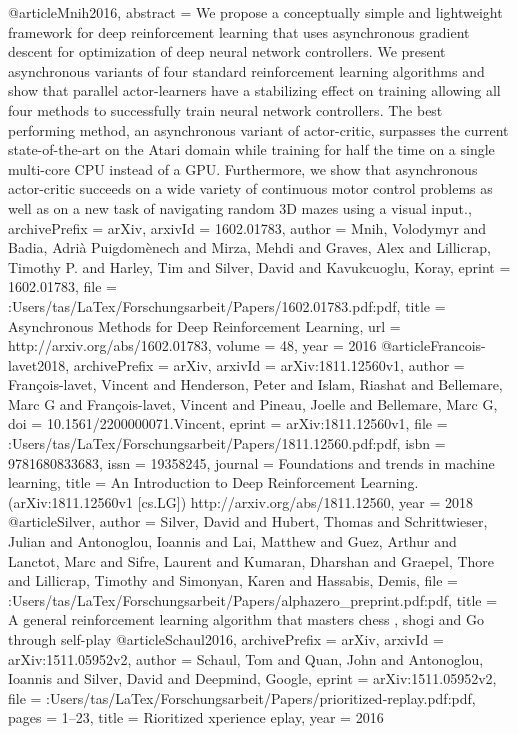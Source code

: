 @article{Mnih2016,
abstract = {We propose a conceptually simple and lightweight framework for deep reinforcement learning that uses asynchronous gradient descent for optimization of deep neural network controllers. We present asynchronous variants of four standard reinforcement learning algorithms and show that parallel actor-learners have a stabilizing effect on training allowing all four methods to successfully train neural network controllers. The best performing method, an asynchronous variant of actor-critic, surpasses the current state-of-the-art on the Atari domain while training for half the time on a single multi-core CPU instead of a GPU. Furthermore, we show that asynchronous actor-critic succeeds on a wide variety of continuous motor control problems as well as on a new task of navigating random 3D mazes using a visual input.},
archivePrefix = {arXiv},
arxivId = {1602.01783},
author = {Mnih, Volodymyr and Badia, Adri{\`{a}} Puigdom{\`{e}}nech and Mirza, Mehdi and Graves, Alex and Lillicrap, Timothy P. and Harley, Tim and Silver, David and Kavukcuoglu, Koray},
eprint = {1602.01783},
file = {:Users/tas/LaTex/Forschungsarbeit/Papers/1602.01783.pdf:pdf},
title = {{Asynchronous Methods for Deep Reinforcement Learning}},
url = {http://arxiv.org/abs/1602.01783},
volume = {48},
year = {2016}
}
@article{Francois-lavet2018,
archivePrefix = {arXiv},
arxivId = {arXiv:1811.12560v1},
author = {Fran{\c{c}}ois-lavet, Vincent and Henderson, Peter and Islam, Riashat and Bellemare, Marc G and Fran{\c{c}}ois-lavet, Vincent and Pineau, Joelle and Bellemare, Marc G},
doi = {10.1561/2200000071.Vincent},
eprint = {arXiv:1811.12560v1},
file = {:Users/tas/LaTex/Forschungsarbeit/Papers/1811.12560.pdf:pdf},
isbn = {9781680833683},
issn = {19358245},
journal = {Foundations and trends in machine learning},
title = {{An Introduction to Deep Reinforcement Learning. (arXiv:1811.12560v1 [cs.LG]) http://arxiv.org/abs/1811.12560}},
year = {2018}
}
@article{Silver,
author = {Silver, David and Hubert, Thomas and Schrittwieser, Julian and Antonoglou, Ioannis and Lai, Matthew and Guez, Arthur and Lanctot, Marc and Sifre, Laurent and Kumaran, Dharshan and Graepel, Thore and Lillicrap, Timothy and Simonyan, Karen and Hassabis, Demis},
file = {:Users/tas/LaTex/Forschungsarbeit/Papers/alphazero{\_}preprint.pdf:pdf},
title = {{A general reinforcement learning algorithm that masters chess , shogi and Go through self-play}}
}
@article{Schaul2016,
archivePrefix = {arXiv},
arxivId = {arXiv:1511.05952v2},
author = {Schaul, Tom and Quan, John and Antonoglou, Ioannis and Silver, David and Deepmind, Google},
eprint = {arXiv:1511.05952v2},
file = {:Users/tas/LaTex/Forschungsarbeit/Papers/prioritized-replay.pdf:pdf},
pages = {1--23},
title = {{Rioritized xperience eplay}},
year = {2016}
}
